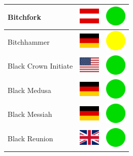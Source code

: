 \documentclass[12pt, a4paper, twoside]{report}
\begin{document}
\begin{center}
\begin{longtable}{|p{5cm}|p{2cm}|p{2cm}|}
 Bitchfork                                                  & \includegraphics[width=1cm]{../4x3/at} &   \includegraphics[width=1cm]{../likes/y} \\ \hline
 Bitchhammer                                                & \includegraphics[width=1cm]{../4x3/de} &   \includegraphics[width=1cm]{../likes/m} \\ \hline
 Black Crown Initiate                                       & \includegraphics[width=1cm]{../4x3/us} &   \includegraphics[width=1cm]{../likes/y} \\ \hline
 Black Medusa                                               & \includegraphics[width=1cm]{../4x3/de} &   \includegraphics[width=1cm]{../likes/y} \\ \hline
 Black Messiah                                              & \includegraphics[width=1cm]{../4x3/de} &   \includegraphics[width=1cm]{../likes/y} \\ \hline
 Black Reunion                                              & \includegraphics[width=1cm]{../4x3/gb} &   \includegraphics[width=1cm]{../likes/y} \\ \hline

\end{longtable}
\end{center}
\end{document}
